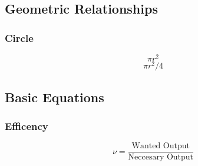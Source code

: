\documentclass[10pt,landscape]{article}
\begin{document}
\begin{multicols}{3}
\subsection{Geometric Relationships}
\subsubsection{Circle}
\begin{equation}
    \pi r^2
\end{equation}
\begin{equation}
    \pi r^2/4
\end{equation}

\subsection{Basic Equations}
\subsubsection{Efficency}
\begin{equation}
    \nu=\frac{\text{Wanted Output}}{\text{Neccesary Output}}
\end{equation}



\end{multicols}
\end{document}
